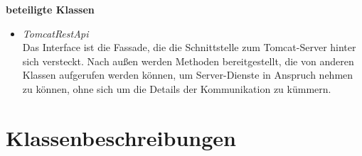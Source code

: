 \documentclass[11pt,a4paper]{report}
\begin{document}
\textbf{beteiligte Klassen}
\begin{itemize}
	\item \textit{TomcatRestApi} \\
	Das Interface ist die Fassade, die die Schnittstelle zum Tomcat-Server hinter sich versteckt. Nach außen werden Methoden bereitgestellt, die von anderen Klassen aufgerufen werden können, um Server-Dienste in Anspruch nehmen zu können, ohne sich um die Details der Kommunikation zu kümmern.
\end{itemize}

\section{Klassenbeschreibungen}

\end{document}
